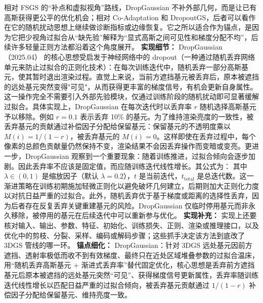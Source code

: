 相对 FSGS 的“补点和虚拟视角”路线，DropGaussian 不补外部几何，而是让已有高斯获得更公平的优化机会；相对 Co-Adaptation 和 DropoutGS，后者可以看作在它的随机扰动思想上继续做诊断指标或边缘恢复。它之所以适合作为锚点，是因为它把少视角过拟合从“缺先验”解释为“显式高斯之间可见性和梯度分配不均”，后续许多轻量正则方法都沿着这个角度展开。
\textbf{实现细节：} DropGaussian（2025.04） 的核心思想受启发于神经网络中的 dropout（一种通过随机丢弃网络单元来防止过拟合的正则化技术）：在每次训练迭代中，随机丢弃一部分高斯基元，使其暂时退出渲染过程。直觉上来说，当前方遮挡基元被丢弃后，原本被遮挡的远处基元突然变得"可见"，从而获得更丰富的梯度信号，有机会更新自身属性。这一操作完全不需要引入外部先验模块，仅通过训练阶段的随机扰动即可显著缓解过拟合。具体实现上，DropGaussian 在每次迭代时以丢弃率 $r$ 随机选择高斯基元予以移除。例如 $r = 0.1$ 表示丢弃 10\% 的基元。为了维持渲染亮度的一致性，被丢弃基元的贡献通过补偿因子分配给保留基元：保留基元的不透明度乘以 $M(i) = 1/(1-r)$，被丢弃基元的 $M(i) = 0$。这样即使在丢弃过程中，每个像素的总颜色贡献量仍然保持不变，渲染结果不会因丢弃操作而变暗或变亮。更进一步，DropGaussian 观察到一个重要现象：随着训练推进，过拟合倾向会逐步加剧。因此丢弃率不应该是固定值，而应随训练迭代线性增长。其公式为： 其中 $\lambda \in (0,1)$ 是缩放因子（默认 $\lambda = 0.2$），$t$ 是当前迭代，$t_{\mathrm{total}}$ 是总迭代数。这一渐进策略在训练初期施加轻微正则化以避免破坏几何建立，后期则加大正则化力度以对抗日益严重的过拟合。此外，随机丢弃优于基于梯度或距离的选择性丢弃，因为后者存在反复丢弃关键重建基元的风险。DropGaussian 仅临时停用基元而非永久移除，被停用的基元在后续迭代中可以重新参与优化。
\textbf{实现补充：} 实现上还要核对输入、输出、参数、特征、初始化、训练损失、正则、渲染或推理接口，以及优化中的剪枝、分裂、采样、编码或解码步骤；这些抓手决定该方法到底改了 3DGS 管线的哪一环。
\textbf{锚点细化：} DropGaussian：针对 3DGS 远处基元因前方遮挡、透射率极低而收不到有效梯度、最终只在近处区域堆叠参数的过拟合温床，用``随机丢弃高斯基元 + 渐进式丢弃率''替代固定优化，核心思想是丢弃前方遮挡基元后原本被遮挡的远处基元突然``可见''、获得梯度信号更新属性，丢弃率随训练迭代线性增长以匹配日益严重的过拟合倾向，被丢弃基元贡献通过 $1/(1-r)$ 补偿因子分配给保留基元、维持亮度一致。
